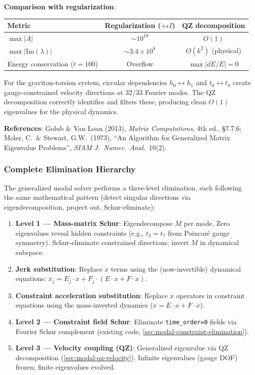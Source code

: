 \textbf{Comparison with regularization}:
\begin{center}
\begin{tabular}{@{}lcc@{}}
\toprule
Metric & Regularization ($+\epsilon I$) & QZ decomposition \\
\midrule
$\max|A|$ & $\sim 10^{19}$ & $O(1)$ \\
$\max|\mathrm{Im}(\lambda)|$ & $\sim 3.4 \times 10^8$ & $O(k^2)$ (physical) \\
Energy conservation ($t=100$) & Overflow & $\max|dE/E| = 0$ \\
\bottomrule
\end{tabular}
\end{center}

For the graviton-torsion system, circular dependencies $h_0 \leftrightarrow h_1$ and $t_0 \leftrightarrow t_8$ create gauge-constrained velocity directions at 32/33 Fourier modes. The QZ decomposition correctly identifies and filters these, producing clean $O(1)$ eigenvalues for the physical dynamics.

\textbf{References}: Golub \& Van Loan (2013), \emph{Matrix Computations}, 4th ed., \S7.7.6; Moler, C.\ \& Stewart, G.W.\ (1973), ``An Algorithm for Generalized Matrix Eigenvalue Problems'', \emph{SIAM J.\ Numer.\ Anal.}\ 10(2).

\subsubsection{Complete Elimination Hierarchy}
\label{sec:modal-elimination-hierarchy}

The generalized modal solver performs a three-level elimination, each following the same mathematical pattern (detect singular directions via eigendecomposition, project out, Schur-eliminate):

\begin{enumerate}
  \item \textbf{Level 1 --- Mass-matrix Schur}: Eigendecompose $M$ per mode. Zero eigenvalues reveal hidden constraints (e.g., $t_3 = t_7$ from Poincar\'e gauge symmetry). Schur-eliminate constrained directions; invert $M$ in dynamical subspace.
  \item \textbf{Jerk substitution}: Replace $\dddot{x}$ terms using the (now-invertible) dynamical equations: $\dddot{x}_j = E_j \cdot \dot{x} + F_j \cdot (E \cdot x + F \cdot \dot{x})$.
  \item \textbf{Constraint acceleration substitution}: Replace $\ddot{x}$ operators in constraint equations using the mass-inverted dynamics ($\ddot{x} = E \cdot x + F \cdot \dot{x}$).
  \item \textbf{Level 2 --- Constraint field Schur}: Eliminate \texttt{time\_order=0} fields via Fourier Schur complement (existing code, \cref{sec:modal-constraint-elimination}).
  \item \textbf{Level 3 --- Velocity coupling (QZ)}: Generalized eigenvalue via QZ decomposition (\cref{sec:modal-qz-velocity}). Infinite eigenvalues (gauge DOF) frozen; finite eigenvalues evolved.
\end{enumerate}

